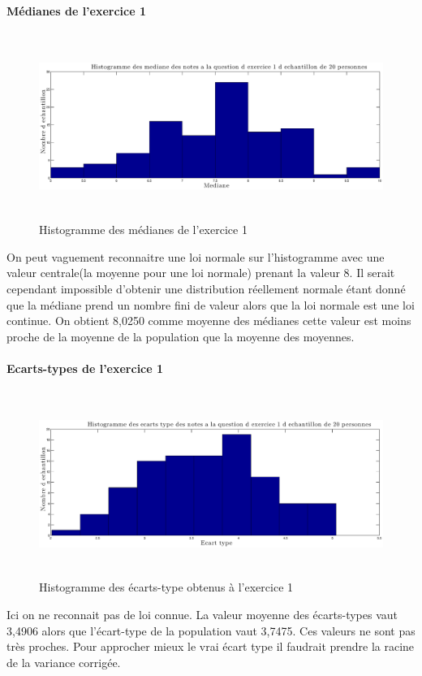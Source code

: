 \documentclass[a4paper, 11pt]{article}
\begin{document}
\paragraph{Médianes de l'exercice 1} 
	\begin{figure} [H]
	\begin{center}
		\includegraphics[height=6cm, width = 12cm]{Fig/Q2B2.eps}
		\caption{Histogramme des médianes de l'exercice 1}
		\label{Q2B}
	\end{center}	
	\end{figure}
	On peut vaguement reconnaitre une loi normale sur l'histogramme avec une valeur centrale(la moyenne pour une loi normale) prenant la valeur 8. Il serait cependant impossible d'obtenir une distribution réellement normale étant donné que la médiane prend un nombre fini de valeur alors que la loi normale est une loi continue. On obtient 8,0250 comme moyenne des médianes cette valeur est moins proche de la moyenne de la population que la moyenne des moyennes.
	\paragraph{Ecarts-types de l'exercice 1} 
	\begin{figure} [H]
	\begin{center}
		\includegraphics[height=6cm, width = 12cm]{Fig/Q2B3.eps}
		\caption{Histogramme des écarts-type obtenus à l'exercice 1}
		\label{Q2B}
	\end{center}	
	\end{figure}
	Ici on ne reconnait pas de loi connue. La valeur moyenne des écarts-types vaut 3,4906 alors que l'écart-type de la population vaut 3,7475. Ces valeurs ne sont pas très proches. Pour approcher mieux le vrai écart type il faudrait prendre la racine de la variance corrigée.
\end{document}
